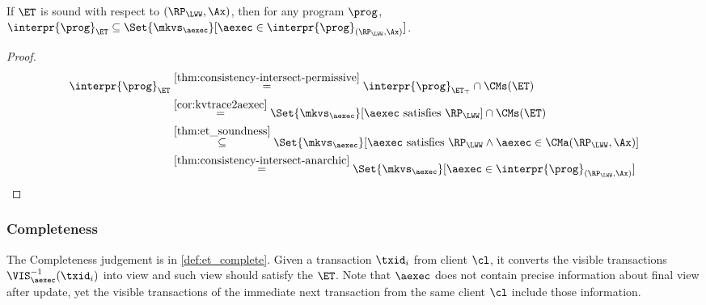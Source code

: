 \begin{corollary}
\label{cor:et-soundness}
If $\ET$ is sound with respect to $(\RP_{\LWW}, \Ax)$, then 
for any program $\prog$, $\interpr{\prog}_{\ET} \subseteq \Set{ \mkvs_{\aexec} }[ \aexec \in \interpr{\prog}_{(\RP_{\LWW}, \Ax)} ]$.
\end{corollary}
\begin{proof}
\begin{align*}
\interpr{\prog}_{\ET} 
& \stackrel{\cref{thm:consistency-intersect-permissive}}{=} 
\interpr{\prog}_{\ET_\top} \cap \CMs(\ET) \\
& \stackrel{\cref{cor:kvtrace2aexec}}{=} 
\Set{\mkvs_{\aexec} }[ \aexec \text{ satisfies } \RP_{\LWW}] \cap \CMs(\ET) \\
& \stackrel{\cref{thm:et_soundness}}{\subseteq} 
\Set{\mkvs_{\aexec} }[ \aexec \text{ satisfies } \RP_{\LWW} \land \aexec \in \CMa(\RP_{\LWW}, \Ax) ] \\
& \stackrel{\cref{thm:consistency-intersect-anarchic}}{=}
\Set{ \mkvs_{\aexec} }[ \aexec \in \interpr{\prog}_{(\RP_{\LWW}, \Ax)} ]
\end{align*}
\end{proof}

\subsubsection{Completeness}
The Completeness judgement is in \cref{def:et_complete}.
Given a transaction \( \txid_i \) from client \( \cl \), it converts the visible transactions \( \VIS_{\aexec}^{-1}(\txid_{i}) \) into view  and such view should satisfy the \( \ET \).
Note that \( \aexec \) does not contain precise information about final view after update,
yet the visible transactions of the immediate next transaction from the same client \( \cl \) include those information.

